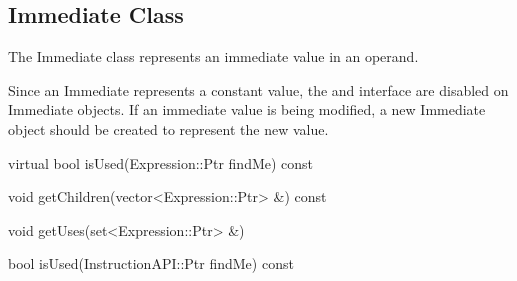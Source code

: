 \subsection{Immediate Class}
\label{sec:immediate}

The Immediate class represents an immediate value in an operand.

Since an Immediate represents a constant value, the  and
 interface are disabled on Immediate objects. If an immediate
value is being modified, a new Immediate object should be created to represent
the new value. 

\begin{apient}
virtual bool isUsed(Expression::Ptr findMe) const
\end{apient}

\begin{apient}
void getChildren(vector<Expression::Ptr> &) const
\end{apient}

\begin{apient}
void getUses(set<Expression::Ptr> &)
\end{apient}

\begin{apient}
bool isUsed(InstructionAPI::Ptr findMe) const
\end{apient}

